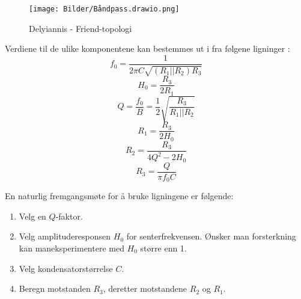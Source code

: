 \begin{figure} [!h]
\centering
\texttt{[image: Bilder/Båndpass.drawio.png]}
\caption{Delyiannis - Friend-topologi}
\label{fig:SallenKey}
\end{figure}
\newpage
Verdiene til de ulike komponentene kan bestemmes ut i fra følgene ligninger \cite{Active Filter}:
\begin{equation}
    \label{eq:f}
    f_0 = \frac{1}{2 \pi C \sqrt{(R_1||R_2)R_3}}
\end{equation}
\begin{equation}
    \label{eq:h}
    H_0 = \frac{R_3}{2R_1}
\end{equation}
\begin{equation}
    \label{eq:q}
    Q = \frac{f_0}{B} = \frac{1}{2} \sqrt{\frac{R_3}{R_1||R_2}}
\end{equation}
\begin{equation}
    \label{eq:r1}
    R_1 = \frac{R_3}{2H_0}
\end{equation}
\begin{equation}
    \label{eq:r2}
    R_2 = \frac{R_3}{4Q^2 -2H_0}
\end{equation}
\begin{equation}
    \label{eq:r3}
    R_3 = \frac{Q}{\pi f_0 C}
\end{equation}

En naturlig fremgangsmøte for å bruke ligningene er følgende: \cite{støygenerator}
\begin{enumerate}
    \item Velg en $Q$-faktor.
    \item Velg amplituderesponsen $H_0$ for senterfrekvensen. Ønsker man forsterkning kan maneksperimentere med $H_0$ større enn 1.
    \item Velg kondensatorstørrelse $C$.
    \item Beregn motstanden $R_3$, deretter motstandene $R_2$ og $R_1$.
\end{enumerate}
